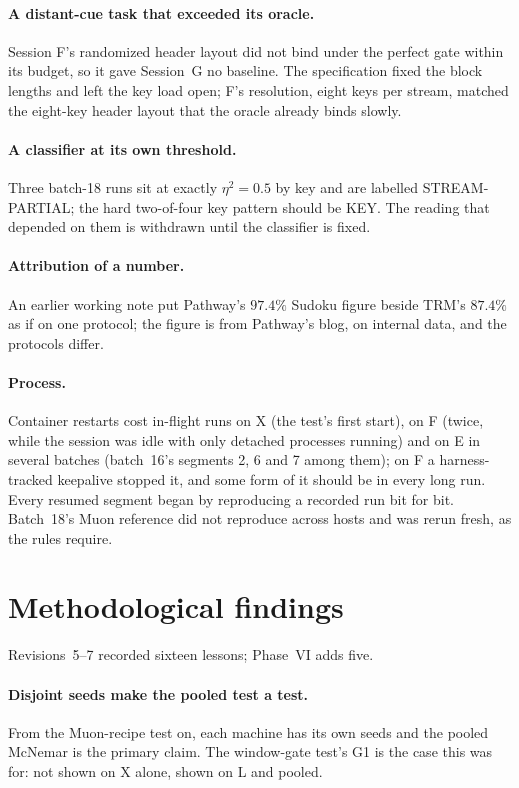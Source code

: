 \documentclass[11pt]{article}
\begin{document}
\paragraph{A distant-cue task that exceeded its oracle.} Session F's randomized header layout did not bind under the perfect gate within its budget, so it gave Session~G no baseline. The specification fixed the block lengths and left the key load open; F's resolution, eight keys per stream, matched the eight-key header layout that the oracle already binds slowly.

\paragraph{A classifier at its own threshold.} Three batch-18 runs sit at exactly $\eta^2 = 0.5$ by key and are labelled STREAM-PARTIAL; the hard two-of-four key pattern should be KEY. The reading that depended on them is withdrawn until the classifier is fixed.

\paragraph{Attribution of a number.} An earlier working note put Pathway's $97.4\%$ Sudoku figure beside TRM's $87.4\%$ as if on one protocol; the figure is from Pathway's blog, on internal data, and the protocols differ.

\paragraph{Process.} Container restarts cost in-flight runs on X (the test's first start), on F (twice, while the session was idle with only detached processes running) and on E in several batches (batch~16's segments 2, 6 and 7 among them); on F a harness-tracked keepalive stopped it, and some form of it should be in every long run. Every resumed segment began by reproducing a recorded run bit for bit. Batch~18's Muon reference did not reproduce across hosts and was rerun fresh, as the rules require.

\section{Methodological findings}
\label{sec:method}

Revisions~5--7 recorded sixteen lessons; Phase~VI adds five.

\paragraph{Disjoint seeds make the pooled test a test.} From the Muon-recipe test on, each machine has its own seeds and the pooled McNemar is the primary claim. The window-gate test's G1 is the case this was for: not shown on X alone, shown on L and pooled.
\end{document}
